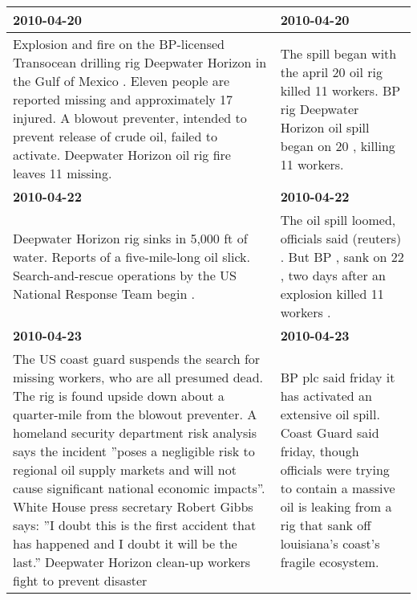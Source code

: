 \documentclass[a4paper,BCOR=10mm]{report}
\numberwithin{lemma}{chapter}
\numberwithin{definition}{chapter}
\begin{document}
\begin{table}
\begin{tabularx}{1.2\textwidth}{|X|X|}
\hline
\textbf{2010-04-20} & \textbf{2010-04-20} \\\hline
Explosion and fire on the BP-licensed Transocean drilling rig Deepwater Horizon in the Gulf of Mexico . \newline Eleven people are reported missing and approximately 17 injured. \newline A blowout preventer, intended to prevent release of crude oil, failed to activate. \newline Deepwater Horizon oil rig fire leaves 11 missing. & The spill began with the april 20 oil rig killed 11 workers. \newline BP rig Deepwater Horizon oil spill began on 20 , killing 11 workers. \\\hline
\textbf{2010-04-22} & \textbf{2010-04-22} \\\hline
Deepwater Horizon rig sinks in 5,000 ft of water. \newline Reports of a five-mile-long oil slick. \newline Search-and-rescue operations by the US National Response Team begin . & The oil spill loomed, officials said (reuters) . \newline But BP , sank on 22 , two days after an explosion killed 11 workers . \\\hline
\textbf{2010-04-23} & \textbf{2010-04-23} \\\hline
The US coast guard suspends the search for missing workers, who are all presumed dead. \newline The rig is found upside down about a quarter-mile from the blowout preventer. \newline A homeland security department risk analysis says the incident ''poses a negligible risk to regional oil supply markets and will not cause significant national economic impacts''. \newline White House press secretary Robert Gibbs says: ''I doubt this is the first accident that has happened and I doubt it will be the last.'' \newline Deepwater Horizon clean-up workers fight to prevent disaster & BP plc said friday it has activated an extensive oil spill. \newline Coast Guard said friday, though officials were trying to contain a massive oil is leaking from a rig that sank off louisiana's coast's fragile ecosystem. \\\hline

\end{tabularx}
\end{table}
\end{document}
